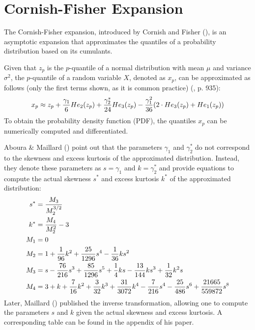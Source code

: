 \section{Cornish-Fisher Expansion}

The Cornish-Fisher expansion, introduced by Cornish and Fisher (\citeyear{cornishMomentsCumulantsSpecification1938}), is an asymptotic expansion that approximates the quantiles of a probability distribution based on its cumulants.

Given that $z_p$ is the $p$-quantile of a normal distribution with mean $\mu$ and variance $\sigma^2$, the $p$-quantile of a random variable $X$, denoted as $x_p$, can be approximated as follows (only the first terms shown, as it is common practice) (\cite{abramowitzHandbookMathematicalFunctions1968}, p. 935):
\begin{align}
    x_p \approx z_p + \frac{\gamma_1}{6}He_2(z_p) + \frac{\gamma_2^*}{24}He_3(z_p) - \frac{\gamma_1^2}{36}(2\cdot He_3(z_p) + He_1(z_p)) \notag
\end{align}
To obtain the probability density function (PDF), the quantiles $x_p$ can be numerically computed and differentiated.

Aboura \& Maillard (\citeyear{abouraOptionPricingSkewness2016}) point out that the parameters $\gamma_1$ and $\gamma_2^*$ do not correspond to the skewness and excess kurtosis of the approximated distribution. Instead, they denote these parameters as $s = \gamma_1$ and $k = \gamma_2^*$ and provide equations to compute the actual skewness $s^*$ and excess kurtosis $k^*$ of the approximated distribution:
\begin{align}
    s^* &= \frac{M_3}{M_{2}^{3/2}} \notag \\
    k^* &= \frac{M_4}{M_{2}^2} - 3 \notag \\
    M_1 &= 0 \\
    M_2 &= 1 + \frac{1}{96}k^2 + \frac{25}{1296}s^4 - \frac{1}{36}ks^2 \\
    M_3 &= s - \frac{76}{216}s^3 + \frac{85}{1296}s^5 + \frac{1}{4}ks - \frac{13}{144}ks^3 + \frac{1}{32}k^2s \\
    M_4 &= 3 + k + \frac{7}{16}k^2 + \frac{3}{32}k^3 + \frac{31}{3072}k^4 - \frac{7}{216}s^4 - \frac{25}{486}s^6 + \frac{21665}{559872}s^8 \notag
\end{align}
Later, Maillard (\citeyear{maillardUserGuideCornish2018}) published the inverse transformation, allowing one to compute the parameters $s$ and $k$ given the actual skewness and excess kurtosis. A corresponding table can be found in the appendix of his paper.

